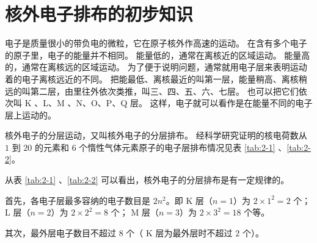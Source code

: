 \section{核外电子排布的初步知识}\label{sec:2-4}

电子是质量很小的带负电的微粒，它在原子核外作高速的运动。
在含有多个电子的原子里，电子的能量并不相同。
能量低的，通常在离核近的区域运动。
能量高的，通常在离核远的区域运动。
为了便于说明问题，通常就用电子层来表明运动着的电子离核远近的不同。
把能最低、离核最近的叫第一层，能量稍高、离核稍远的叫第二层，由里往外依次类推，叫三、四、五、六、七层。
也可以把它们依次叫 K 、L、M 、N、O、P、Q 层。
这样，电子就可以看作是在能量不同的电子层上运动的。

核外电子的分层运动，又叫核外电子的分层排布。
经科学研究证明的核电荷数从 $1$ 到 $20$ 的元素和 $6$ 个惰性气体元素原子的电子层排布情况见表 \ref{tab:2-1} 、\ref{tab:2-2}。

从表 \ref{tab:2-1} 、\ref{tab:2-2} 可以看出，核外电子的分层排布是有一定规律的。

首先，各电子层最多容纳的电子数目是 $2n^2$。即
K 层（$n = 1$）为 $2 \times 1^2 =  2$ 个；
L 层（$n = 2$）为 $2 \times 2^2 =  8$ 个；
M 层（$n = 3$）为 $2 \times 3^2 = 18$ 个等。

其次，最外层电子数目不超过 $8$ 个（ K 层为最外层时不超过 $2$ 个）。


